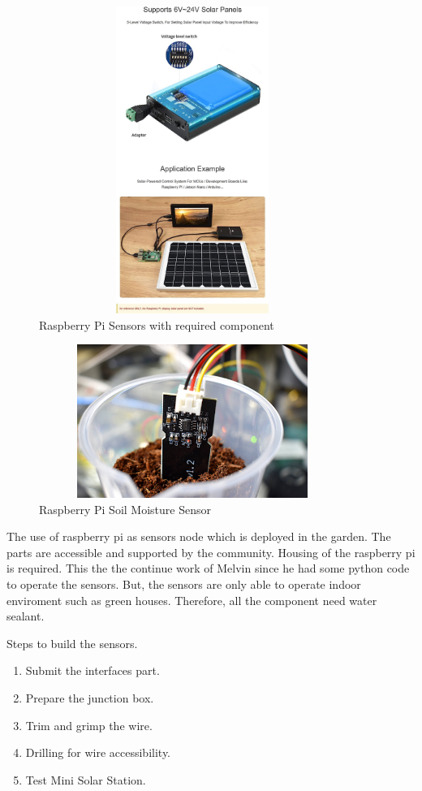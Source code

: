 \documentclass[10pt, a4paper]{article}
\begin{document}
 \begin{figure}[!ht]
  \centering
    \includegraphics[width=10cm, height=10cm]{mppt-with-batter.jpg}
  \caption{Raspberry Pi Sensors with required component}
\end{figure}
 \begin{figure}[!ht]
  \centering
    \includegraphics[width=10cm, height=5cm]{capacitive-moisture-sensors.JPG}
  \caption{Raspberry Pi Soil Moisture Sensor}
\end{figure}
\newpage
\par The use of raspberry pi as sensors node which is deployed in the garden. The parts are accessible and supported by the community. Housing of the raspberry pi is required. This the the continue work of Melvin since he had some python code to operate the sensors. But, the sensors are only able to operate indoor enviroment such as green houses. Therefore, all the component need water sealant. 
\par Steps to build the sensors.
\begin{enumerate}
  \item Submit the interfaces part.
  \item Prepare the junction box.
  \item Trim and grimp the wire.
  \item Drilling for wire accessibility.
  \item Test Mini Solar Station.

\end{enumerate}
\end{document}
